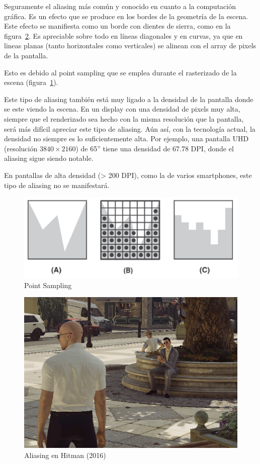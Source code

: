 \documentclass[withindex, glossary]{cam-thesis}
\begin{document}
Seguramente el aliasing más común y conocido en cuanto a la computación gráfica. Es un efecto que se produce en los bordes de la geometría de la escena. Este efecto se manifiesta como un borde con dientes de sierra, como en la figura~\ref{hitmanaliasing}. Es apreciable sobre todo en líneas diagonales y en curvas, ya que en lineas planas (tanto horizontales como verticales) se alinean con el array de pixels de la pantalla.

Esto es debido al point sampling que se emplea durante el rasterizado de la escena (figura~\ref{pointsampling}).

Este tipo de aliasing también está muy ligado a la densidad de la pantalla donde se este viendo la escena. En un display con una densidad de pixels muy alta, siempre que el renderizado sea hecho con la misma resolución que la pantalla, será más difícil apreciar este tipo de aliasing. Aún así, con la tecnología actual, la densidad no siempre es lo suficientemente alta. Por ejemplo, una pantalla UHD (resolución $3840 \times 2160$) de 65'' tiene una densidad de 67.78 DPI, donde el aliasing sigue siendo notable.

En pantallas de alta densidad (> 200 DPI\cite{googledpi}), como la de varios smartphones, este tipo de aliasing no se manifestará.

\begin{figure}[!htbp]
    \includegraphics[width=.7\linewidth]{figures/pointsampling.png}
    \caption{Point Sampling\cite{Shreiner:2013:OPG:2544032}\label{pointsampling}}
\end{figure}

\begin{figure}[!htbp]
    \includegraphics[width=.8\linewidth]{figures/hitmanaliasing.png}
    \caption{Aliasing en Hitman (2016)\label{hitmanaliasing}}
\end{figure}
\end{document}
